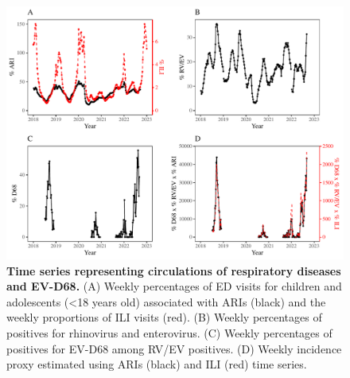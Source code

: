 \documentclass[12pt]{article}
\begin{document}
\begin{figure}[!th]
\includegraphics[width=\textwidth]{../figure_pub/figure_data_processed_d68.pdf}
\caption{
\textbf{Time series representing circulations of respiratory diseases and EV-D68.}
(A) Weekly percentages of ED visits for children and adolescents (<18 years old) associated with ARIs (black) and the weekly proportions of ILI visits (red).
(B) Weekly percentages of positives for rhinovirus and enterovirus.
(C) Weekly percentages of positives for EV-D68 among RV/EV positives.
(D) Weekly incidence proxy estimated using ARIs (black) and ILI (red) time series.
}
\end{figure}

\pagebreak
\end{document}
